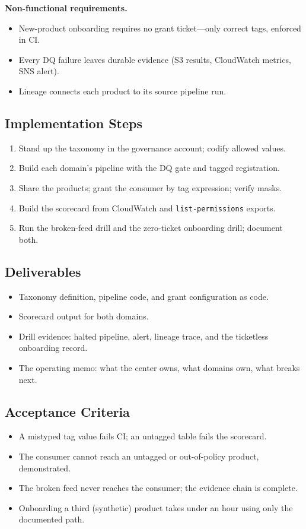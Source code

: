\textbf{Non-functional requirements.}
\begin{itemize}
    \item New-product onboarding requires no grant ticket---only correct tags, enforced in CI.
    \item Every DQ failure leaves durable evidence (S3 results, CloudWatch metrics, SNS alert).
    \item Lineage connects each product to its source pipeline run.
\end{itemize}

\subsection*{Implementation Steps}
\begin{enumerate}
    \item Stand up the taxonomy in the governance account; codify allowed values.
    \item Build each domain's pipeline with the DQ gate and tagged registration.
    \item Share the products; grant the consumer by tag expression; verify masks.
    \item Build the scorecard from CloudWatch and \texttt{list-permissions} exports.
    \item Run the broken-feed drill and the zero-ticket onboarding drill; document both.
\end{enumerate}

\subsection*{Deliverables}
\begin{itemize}
    \item Taxonomy definition, pipeline code, and grant configuration as code.
    \item Scorecard output for both domains.
    \item Drill evidence: halted pipeline, alert, lineage trace, and the ticketless onboarding record.
    \item The operating memo: what the center owns, what domains own, what breaks next.
\end{itemize}

\subsection*{Acceptance Criteria}
\begin{itemize}
    \item A mistyped tag value fails CI; an untagged table fails the scorecard.
    \item The consumer cannot reach an untagged or out-of-policy product, demonstrated.
    \item The broken feed never reaches the consumer; the evidence chain is complete.
    \item Onboarding a third (synthetic) product takes under an hour using only the documented path.
\end{itemize}

